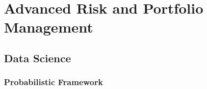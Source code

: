 \documentclass[../main.tex]{subfiles}
\begin{document}
\section{Advanced Risk and Portfolio Management}


\subsection{Data Science}

\subsubsection{Probabilistic Framework}
\end{document}
